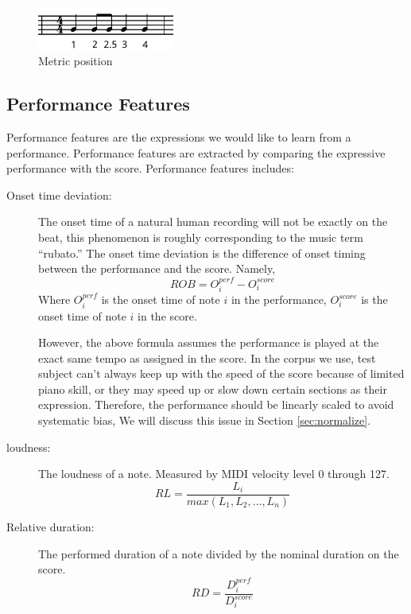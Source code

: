 \begin{description}
   \begin{figure}[tp]
      \begin{center}
         \includegraphics[width=0.4\textwidth]{fig/metrical}
      \end{center}
      \caption{Metric position}
      \label{fig:metrical}
   \end{figure}
      \end{description}




\subsection{Performance Features}
   Performance features are the expressions we would like to learn from a performance. Performance features are extracted by comparing the expressive performance with the score.
      Performance features includes:
      \begin{description}
         \item [Onset time deviation:] 
            The onset time of a natural human recording will not be exactly on the beat, this phenomenon is roughly corresponding to the music term \enquote{rubato.} The onset time deviation is the difference of onset timing between the performance and the score. Namely,
            $$ ROB = O_i^{perf} - O_i^{score} $$ Where $O_i^{perf}$ is the onset time of note $i$ in the performance, $O_i^{score}$ is the onset time of note $i$ in the score. 

            However, the above formula assumes the performance is played at the exact same tempo as assigned in the score. In the corpus we use, test subject can't always keep up with the speed of the score because of limited piano skill, or they may speed up or slow down certain sections as their expression. Therefore, the performance should be linearly scaled to avoid systematic bias, We will discuss this issue in Section \ref{sec:normalize}.
         \item [loudness:] The loudness of a note. Measured by MIDI velocity level 0 through 127.
            $$ RL = \frac{L_i}{max(L_1, L_2, \dots, L_n)}$$

         \item [Relative duration:]
            The performed duration of a note divided by the nominal duration on the score.
            $$ RD = \frac{ D_i^{perf}}{D_i^{score}}$$
      \end{description}


